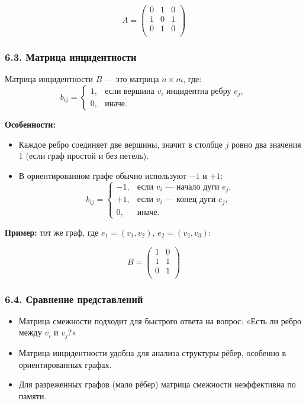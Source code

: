 \[
A =
\begin{pmatrix}
  0 & 1 & 0 \\
  1 & 0 & 1 \\
  0 & 1 & 0 \\
\end{pmatrix}
\]

\subsubsection{6.3. Матрица инцидентности}

Матрица инцидентности $B$ — это матрица $n \times m$, где:
\[
  b_{ij} = \begin{cases}
    1, & \text{если вершина } v_i \text{ инцидентна ребру } e_j, \\
    0, & \text{иначе}.
  \end{cases}
\]

\textbf{Особенности:}
\begin{itemize}[leftmargin=*]
  \item Каждое ребро соединяет две вершины, значит в столбце $j$ ровно два значения 1 (если граф простой и без петель).
  \item В ориентированном графе обычно используют $-1$ и $+1$:  
    \[
    b_{ij} = \begin{cases}
      -1, & \text{если } v_i \text{ — начало дуги } e_j, \\
      +1, & \text{если } v_i \text{ — конец дуги } e_j, \\
      0, & \text{иначе}.
    \end{cases}
    \]
\end{itemize}

\textbf{Пример:} тот же граф, где $e_1 = (v_1,v_2)$, $e_2 = (v_2,v_3)$:

\[
B =
\begin{pmatrix}
  1 & 0 \\
  1 & 1 \\
  0 & 1 \\
\end{pmatrix}
\]

\subsubsection{6.4. Сравнение представлений}

\begin{itemize}[leftmargin=*]
  \item Матрица смежности подходит для быстрого ответа на вопрос: «Есть ли ребро между $v_i$ и $v_j$?»
  \item Матрица инцидентности удобна для анализа структуры рёбер, особенно в ориентированных графах.
  \item Для разреженных графов (мало рёбер) матрица смежности неэффективна по памяти.
\end{itemize}

